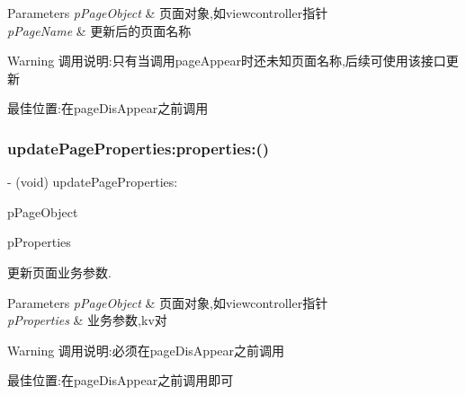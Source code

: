 \begin{DoxyParams}{Parameters}
{\em p\+Page\+Object} & 页面对象,如viewcontroller指针 \\
\hline
{\em p\+Page\+Name} & 更新后的页面名称\\
\hline
\end{DoxyParams}
\begin{DoxyWarning}{Warning}
调用说明\+:只有当调用page\+Appear时还未知页面名称,后续可使用该接口更新 \begin{DoxyVerb}                     最佳位置:在pageDisAppear之前调用\end{DoxyVerb}
 
\end{DoxyWarning}
\mbox{\label{interface_u_t_tracker_a302c0384d947b7d9b21dac1f66032206}} 
\subsubsection{\texorpdfstring{update\+Page\+Properties\+:properties\+:()}{updatePageProperties:properties:()}}
{\footnotesize\ttfamily -\/ (void) update\+Page\+Properties\+: \begin{DoxyParamCaption}\item[{(id)}]{p\+Page\+Object }\item[{properties:(N\+S\+Dictionary $\ast$)}]{p\+Properties }\end{DoxyParamCaption}}



更新页面业务参数. 


\begin{DoxyParams}{Parameters}
{\em p\+Page\+Object} & 页面对象,如viewcontroller指针 \\
\hline
{\em p\+Properties} & 业务参数,kv对\\
\hline
\end{DoxyParams}
\begin{DoxyWarning}{Warning}
调用说明\+:必须在page\+Dis\+Appear之前调用 \begin{DoxyVerb}                     最佳位置:在pageDisAppear之前调用即可\end{DoxyVerb}
 
\end{DoxyWarning}
\mbox{\label{interface_u_t_tracker_adbe97e46febcc741a4f498f5511bc822}} 
